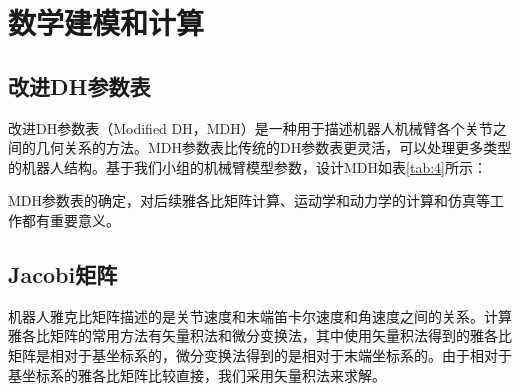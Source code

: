 \section{数学建模和计算}
\subsection{改进DH参数表}
改进DH参数表（Modified DH，MDH）是一种用于描述机器人机械臂各个关节之间的几何关系的方法。MDH参数表比传统的DH参数表更灵活，可以处理更多类型的机器人结构。基于我们小组的机械臂模型参数，设计MDH如表\ref{tab:4}所示：

\begin{table}[h]
	\centering
    \caption{ABB-IRB-1200模型MDH参数表}
    \label{tab:4}
    \vspace{5pt}
\end{table}

MDH参数表的确定，对后续雅各比矩阵计算、运动学和动力学的计算和仿真等工作都有重要意义。

\subsection{Jacobi矩阵}
机器人雅克比矩阵描述的是关节速度和末端笛卡尔速度和角速度之间的关系。计算雅各比矩阵的常用方法有矢量积法和微分变换法，其中使用矢量积法得到的雅各比矩阵是相对于基坐标系的，微分变换法得到的是相对于末端坐标系的。由于相对于基坐标系的雅各比矩阵比较直接，我们采用矢量积法来求解。

